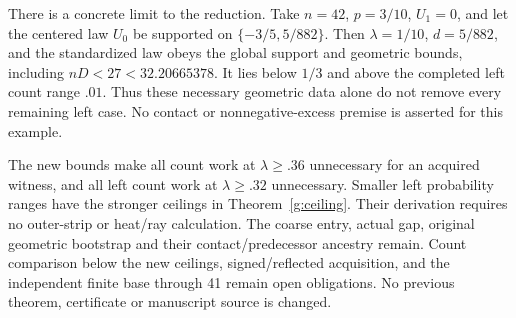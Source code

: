 \documentclass[11pt]{article}
\begin{document}
There is a concrete limit to the reduction. Take $n=42$, $p=3/10$,
$U_1=0$, and let the centered law $U_0$ be supported on
$\{-3/5,5/882\}$. Then $\lambda=1/10$, $d=5/882$,
and the standardized law obeys the global support and geometric bounds,
including $nD<27<32.20665378$. It lies below $1/3$ and above the completed
left count range $.01$. Thus these necessary geometric data alone do not
remove every remaining left case. No contact or nonnegative-excess premise
is asserted for this example.

The new bounds make all count work at $\lambda\ge.36$ unnecessary for
an acquired witness, and all left count work at $\lambda\ge.32$
unnecessary. Smaller left probability ranges have the stronger ceilings
in Theorem~\ref{g:ceiling}. Their derivation requires no outer-strip or
heat/ray calculation. The coarse entry, actual gap, original geometric
bootstrap and their contact/predecessor ancestry remain. Count comparison
below the new ceilings, signed/reflected acquisition, and the independent
finite base through 41 remain open obligations. No previous theorem,
certificate or manuscript source is changed.
\end{document}
